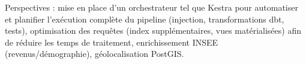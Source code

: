 \documentclass[12pt,a4paper]{article}
\newcommand{\dbt}{dbt}
\begin{document}
Perspectives : mise en place d'un orchestrateur tel que Kestra pour
automatiser et planifier l'exécution complète du pipeline (injection,
transformations \dbt{}, tests), optimisation des requêtes (index
supplémentaires, vues matérialisées) afin de réduire les temps de
traitement, enrichissement INSEE (revenus/démographie), géolocalisation
PostGIS.
\end{document}
